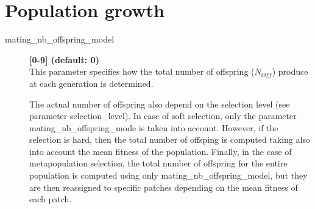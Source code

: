 \documentclass[letterpaper,12pt,oneside]{book}
\begin{document}
\section{Population growth}
\begin{description}
\item[mating\_nb\_offspring\_model] \textbf{[0-9] (default: 0)}\\
This parameter specifies how the total number of offspring ($N_{Off}$) produce at each generation is determined. 

The actual number of offspring also depend on the selection level (see parameter \textsf{selection\_level}). In case of soft selection, only the parameter \textsf{mating\_nb\_offspring\_mode} is taken into account.  However, if the selection is hard, then the total number of offsping is computed taking also into account the mean fitness of the population. Finally, in the case of metapopulation selection, the total number of offspring for the entire population is computed using only  \textsf{mating\_nb\_offspring\_model}, but they are then reassigned to specific patches depending on the mean fitness of each patch. 


\end{description}
\end{document}
